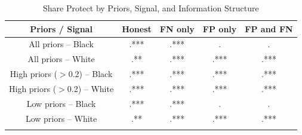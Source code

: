 \begin{table}[H]\centering \caption{Share Protect by Priors, Signal, and Information Structure} \begin{tabular}{ccccc} \hline \hline
\textbf{Priors / Signal}&\textbf{Honest}&\textbf{FN only}&\textbf{FP only}&\textbf{FP and FN}\\ \hline
All priors -- Black&.***&.***&.&.\\
All priors -- White&.**&.***&.***&.***\\
High priors ($>$0.2) -- Black&.***&.***&.***&.***\\
High priors ($>$0.2) -- White&.***&.***&.***&.***\\
Low priors -- Black&.***&.***&.&.\\
Low priors -- White&.**&.***&.***&.***\\
\hline \multicolumn{5}{l}{} \\ \end{tabular} \end{table}
